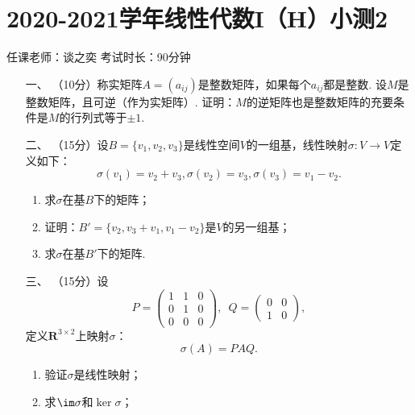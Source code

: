 \section*{2020-2021学年线性代数I（H）小测2}

\begin{center}
    任课老师：谈之奕\hspace{4em} 考试时长：90分钟
\end{center}

\begin{enumerate}
	\item[一、]（10分）称实矩阵$A=(a_{ij})$是整数矩阵，如果每个$a_{ij}$都是整数. 设$M$是整数矩阵，且可逆（作为实矩阵）. 证明：$M$的逆矩阵也是整数矩阵的充要条件是$M$的行列式等于$\pm 1$.
	\item[二、]（15分）设$B=\{v_1,v_2,v_3\}$是线性空间$V$的一组基，线性映射$\sigma:V\to V$定义如下：
	\[\sigma(v_1)=v_2+v_3,\sigma(v_2)=v_3,\sigma(v_3)=v_1-v_2.\]
    \begin{enumerate}[label=(\arabic*)]
        \item 求$\sigma$在基$B$下的矩阵；

        \item 证明：$B'=\{v_2,v_3+v_1,v_1-v_2\}$是$V$的另一组基；

        \item 求$\sigma$在基$B'$下的矩阵.
    \end{enumerate}
	\item[三、]（15分）设
	\[P=\begin{pmatrix}
        1 & 1 & 0 \\ 0 & 1 & 0 \\ 0 & 0 & 0
    \end{pmatrix},\enspace Q=\begin{pmatrix}
        0 & 0 \\ 1 & 0
    \end{pmatrix},\]
    定义$\mathbf{R}^{3\times 2}$上映射$\sigma$：
    \[\sigma(A)=PAQ.\]
    \begin{enumerate}[label=(\arabic*)]
        \item 验证$\sigma$是线性映射；

        \item 求$\im\sigma$和$\ker\sigma$；


\end{enumerate}
\end{enumerate}
